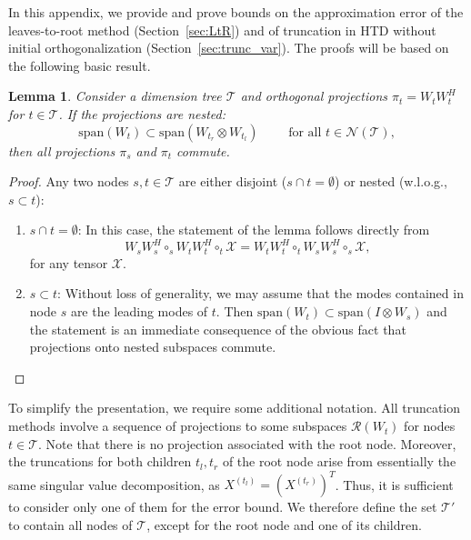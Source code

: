 \documentclass[11pt, a4paper]{article}
\newcommand{\calN}{\mathcal{N}}
\newcommand{\calR}{\mathcal{R}}
\newcommand{\calT}{\mathcal{T}}
\newcommand{\calX}{\mathcal{X}}
\newtheorem{lemma}[theorem]{\bf Lemma}
\begin{document}
\begin{preprint}
In this appendix, we provide and prove bounds on the approximation
error of the leaves-to-root method (Section~\ref{sec:LtR}) and of 
truncation in HTD without initial orthogonalization (Section~\ref{sec:trunc_var}). The proofs will be based on the following basic result.
\begin{lemma} \label{lem:nested_projections} Consider a dimension tree
  $\calT$ and orthogonal projections $\pi_t = W_t W_t^H$ for $t\in \calT$.
If the projections are nested:
  \[
  \text{span}(W_t) \subset \text{span}(W_{t_r} \otimes W_{t_l}) \qquad
  \text{ for all } t \in \calN(\calT),
  \]
  then all projections $\pi_s$ and $\pi_t$ commute.
\end{lemma}
\begin{proof}
Any two nodes $s,t\in \calT$ are either disjoint ($s \cap t =
  \emptyset$) or nested (w.l.o.g., $s \subset t$):
\begin{enumerate}
\item $s \cap t = \emptyset$: In this case, the statement of the lemma follows directly from \[W_s
  W_s^H \circ_s W_t W_t^H \circ_t \calX = W_t W_t^H \circ_t W_s W_s^H
  \circ_s \calX,\] for any tensor $\calX$.
\item $s \subset t$: Without loss of generality, we may assume that the
  modes contained in node $s$ are the leading modes of $t$. Then $\text{span}(W_t) \subset
  \text{span}(I \otimes W_s)$ and the statement is an immediate consequence of the 
  obvious fact that projections onto nested subspaces commute.
\end{enumerate}
\end{proof}
%
\noindent To simplify the presentation, we require some additional notation. All truncation methods
involve a sequence of projections to some subspaces $\calR(W_t)$ for nodes
$t \in \calT$. Note that there is no projection associated with the root node.
Moreover, the truncations for both children $t_l, t_r$ of the root node arise from
essentially the same singular value decomposition, as $X^{(t_l)} = (X^{(t_r)})^T$. Thus, it is sufficient
to consider only one of them for the error
bound. We therefore define the set $\calT'$ to
contain all nodes of $\calT$, except for the root node and one of its
children.


\end{preprint}
\end{document}
